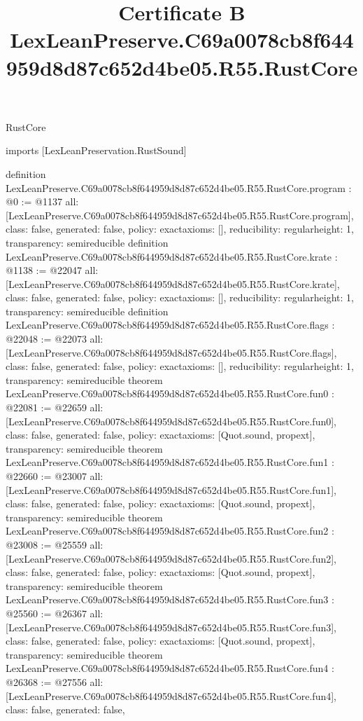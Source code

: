 \begin{lexlean}{RustCore}
\title{Certificate B LexLeanPreserve.C69a0078cb8f644959d8d87c652d4be05.R55.RustCore}
\begin{coremodule}
imports [LexLeanPreservation.RustSound]

definition LexLeanPreserve.C69a0078cb8f644959d8d87c652d4be05.R55.RustCore.program : @0 := @1137 {
  all: [LexLeanPreserve.C69a0078cb8f644959d8d87c652d4be05.R55.RustCore.program],
  class: false,
  generated: false,
  policy: exact{axioms: []},
  reducibility: regular{height: 1},
  transparency: semireducible
}
definition LexLeanPreserve.C69a0078cb8f644959d8d87c652d4be05.R55.RustCore.krate : @1138 := @22047 {
  all: [LexLeanPreserve.C69a0078cb8f644959d8d87c652d4be05.R55.RustCore.krate],
  class: false,
  generated: false,
  policy: exact{axioms: []},
  reducibility: regular{height: 1},
  transparency: semireducible
}
definition LexLeanPreserve.C69a0078cb8f644959d8d87c652d4be05.R55.RustCore.flags : @22048 := @22073 {
  all: [LexLeanPreserve.C69a0078cb8f644959d8d87c652d4be05.R55.RustCore.flags],
  class: false,
  generated: false,
  policy: exact{axioms: []},
  reducibility: regular{height: 1},
  transparency: semireducible
}
theorem LexLeanPreserve.C69a0078cb8f644959d8d87c652d4be05.R55.RustCore.fun0 : @22081 := @22659 {
  all: [LexLeanPreserve.C69a0078cb8f644959d8d87c652d4be05.R55.RustCore.fun0],
  class: false,
  generated: false,
  policy: exact{axioms: [Quot.sound, propext]},
  transparency: semireducible
}
theorem LexLeanPreserve.C69a0078cb8f644959d8d87c652d4be05.R55.RustCore.fun1 : @22660 := @23007 {
  all: [LexLeanPreserve.C69a0078cb8f644959d8d87c652d4be05.R55.RustCore.fun1],
  class: false,
  generated: false,
  policy: exact{axioms: [Quot.sound, propext]},
  transparency: semireducible
}
theorem LexLeanPreserve.C69a0078cb8f644959d8d87c652d4be05.R55.RustCore.fun2 : @23008 := @25559 {
  all: [LexLeanPreserve.C69a0078cb8f644959d8d87c652d4be05.R55.RustCore.fun2],
  class: false,
  generated: false,
  policy: exact{axioms: [Quot.sound, propext]},
  transparency: semireducible
}
theorem LexLeanPreserve.C69a0078cb8f644959d8d87c652d4be05.R55.RustCore.fun3 : @25560 := @26367 {
  all: [LexLeanPreserve.C69a0078cb8f644959d8d87c652d4be05.R55.RustCore.fun3],
  class: false,
  generated: false,
  policy: exact{axioms: [Quot.sound, propext]},
  transparency: semireducible
}
theorem LexLeanPreserve.C69a0078cb8f644959d8d87c652d4be05.R55.RustCore.fun4 : @26368 := @27556 {
  all: [LexLeanPreserve.C69a0078cb8f644959d8d87c652d4be05.R55.RustCore.fun4],
  class: false,
  generated: false,
}
\end{coremodule}
\end{lexlean}
